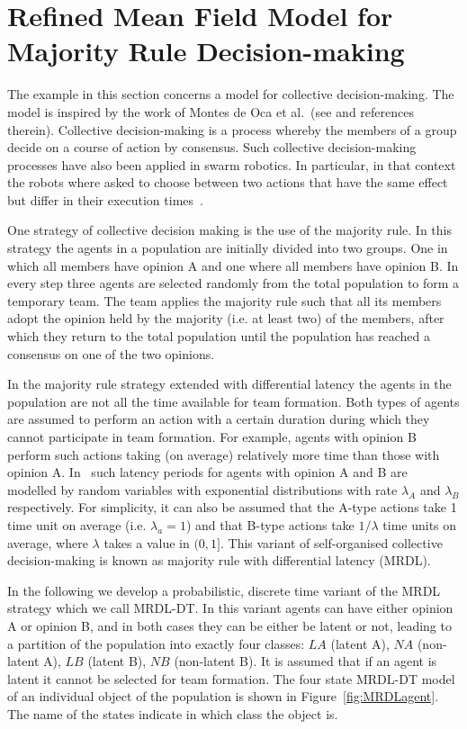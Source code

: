 \documentclass[review]{elsarticle}
\begin{document}
\section{Refined Mean Field Model for Majority Rule Decision-making}
\label{sect:RefVoting}


The example in this section concerns a model for collective decision-making. The model is inspired by the work of Montes de Oca et al.~(see \cite{Mo+11,Sch11} and references therein). Collective decision-making is a process whereby the members of a group decide on a course of action by consensus. Such collective decision-making processes have also been applied in swarm robotics. In particular, in that context the robots where asked to choose between two actions that have the same effect but differ in their execution times~\cite{Mo+11}. 

One strategy of collective decision making is the use of the majority rule. In this strategy the agents in a population are initially divided into two groups. One in which all members have opinion A and one where all members have opinion B. In every step three agents are selected randomly from the total population to form a temporary team. The team applies the majority rule such that all its members adopt the opinion held by the majority (i.e. at least two) of the members, after which they return to the total population until the population has reached a consensus on one of the two opinions. 

In the majority rule strategy extended with differential latency the agents in the population are not all the time available for team formation. Both types of agents are assumed to perform an action with a certain duration during which they cannot participate in team formation. For example, agents with opinion B perform such actions taking (on average) relatively more time than those with opinion A. In~\cite{Mo+11} such latency periods for agents with opinion A and B are modelled by random variables with exponential distributions with rate $\lambda_A$ and $\lambda_B$ respectively.  For simplicity, it can also be assumed that the A-type actions take 1 time unit on average (i.e. $\lambda_a=1$) and that B-type actions take $1/\lambda$ time units on average, where $\lambda$ takes a value in $(0,1]$. This variant of self-organised collective decision-making is known as majority rule with differential latency (MRDL).

In the following we develop a probabilistic, discrete time variant of the MRDL strategy which we call MRDL-DT. In this variant agents can have either opinion A or opinion B, and in both cases they can be either be latent or not, leading to a partition of the population into exactly four classes: $\mathit{LA}$ (latent A), $\mathit{NA}$ (non-latent A), $\mathit{LB}$ (latent B), $\mathit{NB}$ (non-latent B). It is assumed that if an agent is latent it cannot be selected for team formation. The four state MRDL-DT model of an individual object of the population is shown in Figure~\ref{fig:MRDLagent}. The name of the states indicate in which class the object is.
\end{document}
